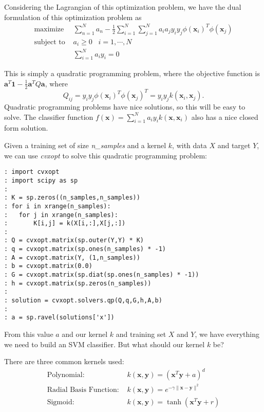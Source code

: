 Considering the Lagrangian of this optimization problem, we have the dual formulation of this optimization problem as
\begin{align*}
\text{maximize } & \sum_{n=1}^{N} a_{n} - \frac{1}{2} \sum_{i=1}^{N}\sum_{j=1}^{N} a_{i}a_{j}y_{i}y_{j}\phi(\mathbf{x}_{i})^{T}\phi(\mathbf{x}_{j}) \\
\text{subject to } & a_{i} \geq 0 \; \; \; i = 1, \cdots, N \\
 & \sum_{i=1}^{N} a_{i}y_{i} = 0
\end{align*}

This is simply a quadratic programming problem, where the objective function is $\mathbf{a}^{T}\mathbf{1} - \frac{1}{2} \mathbf{a}^{T}Q\mathbf{a}$, where $$Q_{ij} = y_{i}y_{j}\phi(\mathbf{x}_{i})^{T}\phi(\mathbf{x}_{j})^{T} = y_{i}y_{j}k(\mathbf{x}_{i},\mathbf{x}_{j}).$$ Quadratic programming problems have nice solutions, so this will be easy to solve. The classifier function $f(\mathbf{x}) = \sum_{i=1}^{N} a_{i}y_{i}k(\mathbf{x},\mathbf{x}_{i})$ also has a nice closed form solution.

Given a training set of size \emph{n\_samples} and a kernel $k$, with data $X$ and target $Y$, we can use \emph{cvxopt} to solve this quadratic programming problem:

\begin{lstlisting}[style=python]
: import cvxopt
: import scipy as sp
:
: K = sp.zeros((n_samples,n_samples))
: for i in xrange(n_samples):
: 	for j in xrange(n_samples):
:		K[i,j] = k(X[i,:],X[j,:])
:
: Q = cvxopt.matrix(sp.outer(Y,Y) * K)
: q = cvxopt.matrix(sp.ones(n_samples) * -1)
: A = cvxopt.matrix(Y, (1,n_samples))
: b = cvxopt.matrix(0.0)
: G = cvxopt.matrix(sp.diat(sp.ones(n_samples) * -1))
: h = cvxopt.matrix(sp.zeros(n_samples))
:
: solution = cvxopt.solvers.qp(Q,q,G,h,A,b)
:
: a = sp.ravel(solutions['x'])
\end{lstlisting}

From this value $a$ and our kernel $k$ and training set $X$ and $Y$, we have everything we need to build an SVM classifier. But what should our kernel $k$ be?

There are three common kernels used:
\begin{align*}
\text{Polynomial: } & k(\mathbf{x},\mathbf{y}) = (\mathbf{x}^{T}\mathbf{y} + a)^{d} \\
\text{Radial Basis Function: } & k(\mathbf{x},\mathbf{y}) = e^{-\gamma \| \mathbf{x} - \mathbf{y} \|^{2}} \\
\text{Sigmoid: } & k(\mathbf{x},\mathbf{y}) = \tanh \left(\mathbf{x}^{T}\mathbf{y} + r \right)
\end{align*}

